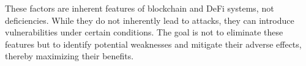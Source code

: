 These factors are inherent features of blockchain and DeFi systems, not deficiencies. While they do not inherently lead to attacks, they can introduce vulnerabilities under certain conditions. The goal is not to eliminate these features but to identify potential weaknesses and mitigate their adverse effects, thereby maximizing their benefits.

